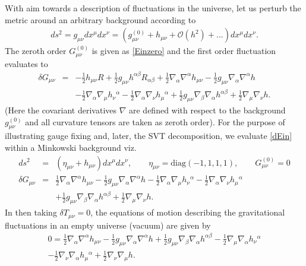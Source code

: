 With aim towards a description of fluctuations in the universe, let us perturb the metric around an arbitrary background according to
\begin{eqnarray}
ds^2=g_{\mu\nu}dx^\mu dx^\nu = (g^{(0)}_{\mu\nu} + h_{\mu\nu} + \mathcal O(h^2)+ ...)dx^\mu dx^\nu.
\end{eqnarray}
The zeroth order $G_{\mu\nu}^{(0)}$ is given as \eqref{Einzero} and the first order fluctuation evaluates to 
\begin{eqnarray}
\delta G_{\mu\nu} &=& 
- \tfrac{1}{2} h_{\mu \nu } R + \tfrac{1}{2} g_{\mu \nu } h^{\alpha \beta } R_{\alpha \beta } + \tfrac{1}{2} \nabla_{\alpha }\nabla^{\alpha }h_{\mu \nu } -  \tfrac{1}{2} g_{\mu \nu } \nabla_{\alpha }\nabla^{\alpha }h \nonumber\\
&& -  \tfrac{1}{2} \nabla_{\alpha }\nabla_{\mu }h_{\nu }{}^{\alpha } -  \tfrac{1}{2} \nabla_{\alpha }\nabla_{\nu }h_{\mu }{}^{\alpha } + \tfrac{1}{2} g_{\mu \nu } \nabla_{\beta }\nabla_{\alpha }h^{\alpha \beta } + \tfrac{1}{2} \nabla_{\mu }\nabla_{\nu }h.
\label{dEin}
\end{eqnarray}
(Here the covariant derivatives $\nabla$ are defined with respect to the background $g_{\mu\nu}^{(0)}$ and all curvature tensors are taken as zeroth order). For the purpose of illustrating gauge fixing and, later, the SVT decomposition, we evaluate \eqref{dEin} within a Minkowski background viz.
\begin{eqnarray}
ds^2 &=& (\eta_{\mu\nu} + h_{\mu\nu})dx^\mu dx^\nu, \qquad \eta_{\mu\nu} = \text{diag}(-1,1,1,1),\qquad G^{(0)}_{\mu\nu} = 0
\nonumber\\
\delta G_{\mu\nu} &=& \tfrac{1}{2} \nabla_{\alpha }\nabla^{\alpha }h_{\mu \nu } -  \tfrac{1}{2} g_{\mu \nu } \nabla_{\alpha }\nabla^{\alpha }h -  \tfrac{1}{2} \nabla_{\alpha }\nabla_{\mu }h_{\nu }{}^{\alpha } -  \tfrac{1}{2} \nabla_{\alpha }\nabla_{\nu }h_{\mu }{}^{\alpha } 
\nonumber\\
&&+ \tfrac{1}{2} g_{\mu \nu } \nabla_{\beta }\nabla_{\alpha }h^{\alpha \beta } + \tfrac{1}{2} \nabla_{\mu }\nabla_{\nu }h.
\label{dEinflat}
\end{eqnarray}
In then taking $\delta T_{\mu\nu}=0$, the equations of motion describing the gravitational fluctuations in an empty universe (vacuum) are given by 
\begin{eqnarray}
0=\tfrac{1}{2} \nabla_{\alpha }\nabla^{\alpha }h_{\mu \nu } -  \tfrac{1}{2} g_{\mu \nu } \nabla_{\alpha }\nabla^{\alpha }h + \tfrac{1}{2} g_{\mu \nu } \nabla_{\beta }\nabla_{\alpha }h^{\alpha \beta } -  \tfrac{1}{2} \nabla_{\mu }\nabla_{\alpha }h_{\nu }{}^{\alpha }
\nonumber\\
 -  \tfrac{1}{2} \nabla_{\nu }\nabla_{\alpha }h_{\mu }{}^{\alpha } + \tfrac{1}{2} \nabla_{\nu }\nabla_{\mu }h.
\label{dEinflatEOM}
\end{eqnarray}


